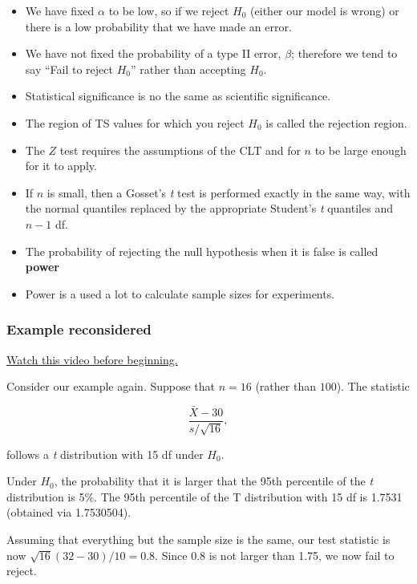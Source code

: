 \documentclass[]{article}
\begin{document}
\begin{itemize}
\itemsep1pt\parskip0pt
\item
  We have fixed $\alpha$ to be low, so if we reject $H_0$ (either our
  model is wrong) or there is a low probability that we have made an
  error.
\item
  We have not fixed the probability of a type II error, $\beta$;
  therefore we tend to say ``Fail to reject $H_0$'' rather than
  accepting $H_0$.
\item
  Statistical significance is no the same as scientific significance.
\item
  The region of TS values for which you reject $H_0$ is called the
  rejection region.
\item
  The $Z$ test requires the assumptions of the CLT and for $n$ to be
  large enough for it to apply.
\item
  If $n$ is small, then a Gosset's \emph{t} test is performed exactly in
  the same way, with the normal quantiles replaced by the appropriate
  Student's \emph{t} quantiles and $n-1$ df.
\item
  The probability of rejecting the null hypothesis when it is false is
  called \textbf{power}
\item
  Power is a used a lot to calculate sample sizes for experiments.
\end{itemize}

\subsubsection{Example reconsidered}\label{example-reconsidered}

\href{http://youtu.be/5iMMBTlOFTI?list=PLpl-gQkQivXiBmGyzLrUjzsblmQsLtkzJ}{Watch
this video before beginning.}

Consider our example again. Suppose that $n= 16$ (rather than $100$).
The statistic

\[
\frac{\bar X - 30}{s / \sqrt{16}},
\]

follows a \emph{t} distribution with 15 df under $H_0$.

Under $H_0$, the probability that it is larger that the 95th percentile
of the \emph{t} distribution is 5\%. The 95th percentile of the T
distribution with 15 df is 1.7531 (obtained via 1.7530504).

Assuming that everything but the sample size is the same, our test
statistic is now $\sqrt{16}(32 - 30) / 10 = 0.8$. Since 0.8 is not
larger than 1.75, we now fail to reject.
\end{document}
